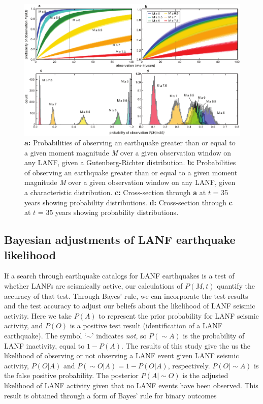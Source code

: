 \documentclass[twocolumn,grl]{AGUTeX}
\begin{document}
\begin{article}
\begin{figure}%
\noindent\includegraphics[width=40pc]{./figures/all_probs_2x2.pdf}
\caption{\textbf{a:} Probabilities of observing an earthquake greater than or 
equal to a given moment magnitude \emph{M} over a given observation window on 
any LANF, given a Gutenberg-Richter distribution. 
\textbf{b:} Probabilities of observing an earthquake greater than or 
equal to a given moment magnitude \emph{M} over a given observation window on 
any LANF, given a characteristic distribution. 
\textbf{c:} Cross-section through \textbf{a} at $t$ = 35 years
showing probability distributions.
\textbf{d:} Cross-section through \textbf{c} at $t$ = 35 years
showing probability distributions.}

\label{fig:all_probs}
\end{figure}

\subsection{Bayesian adjustments of LANF earthquake likelihood}
If a search through earthquake catalogs for LANF earthquakes is a test of
whether LANFs are seismically active, our calculations of $ P(M,t)$ quantify
the accuracy of that test.  Through Bayes' rule, we can incorporate the test
results and the test accuracy to adjust our beliefs about the likelihood
of LANF seismic activity.  Here we take $P(A)$ to represent the prior
probability for LANF seismic activity, and $ P(O)$ is a positive test result
(identification of a LANF earthquake).  The symbol `$\sim$' indicates
\emph{not}, so $P(\sim A)$ is the probability of LANF inactivity, 
equal to $ 1 - P(A)$.  
The results of this study give the us the likelihood of observing or not
observing a LANF event given LANF seismic activity, $P(O|A)$ and 
$P(\sim O | A) = 1 - P(O|A)$, respectively.  $P(O | \sim A)$ is the false
positive probability.  The posterior $P(A |\sim O)$ is the adjusted
likelihood of LANF activity given that no LANF events have been observed.
This result is obtained through a form of Bayes' rule for binary outcomes


\end{article}
\end{document}
